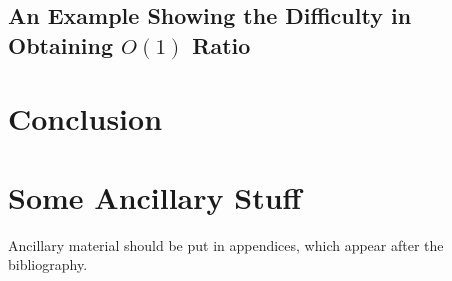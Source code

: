 \documentclass[oneside,final]{ucr}
\begin{document}
\section{An Example Showing the Difficulty in Obtaining $O(1)$ Ratio}

\chapter{Conclusion} \label{ch: conclusion}




\appendix
\chapter{Some Ancillary Stuff}

Ancillary material should be put in appendices, which appear after the
bibliography. 
\end{document}
